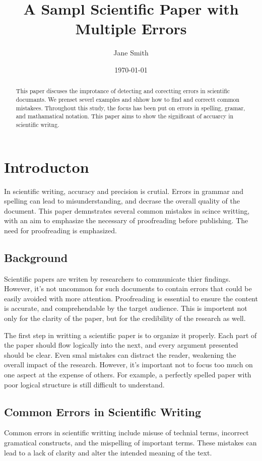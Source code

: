 \documentclass{article}
\title{A Sampl Scientific Paper with Multiple Errors}
\author{Jane Smith}
\date{\today}
\begin{document}
\maketitle

\begin{abstract}
This paper discuses the improtance of detecting and corectting errors in scientific documants. We prenset severl examples and shhow how to find and correctt common mistakees. Throughout this study, the focus has been put on errors in spelling, gramar, and mathamatical notation. This paper aims to show the significant of accuarcy in scientific writng.
\end{abstract}

\section{Introducton}
In scientific writing, accuracy and precision is crutial. Errors in grammar and spelling can lead to misunderstanding, and decrase the overall quality of the document. This paper demnstrates several common mistakes in scince writting, with an aim to emphasize the necessary of proofreading before publishing. The need for proofreading is emphasized.

\subsection{Background}
Scientific papers are writen by researchers to communicate thier findings. However, it's not uncommon for such documents to contain errors that could be easily avoided with more attention. Proofreading is essential to ensure the content is accurate, and comprehendable by the target audience. This is importent not only for the clarity of the paper, but for the credibility of the research as well.

The first step in writting a scientific paper is to organize it properly. Each part of the paper should flow logically into the next, and every argument presented should be clear. Even smal mistakes can distract the reader, weakening the overall impact of the research. However, it's important not to focus too much on one aspect at the expense of others. For example, a perfectly spelled paper with poor logical structure is still difficult to understand.

\subsection{Common Errors in Scientific Writing}
Common errors in scientific writting include misuse of technial terms, incorrect gramatical constructs, and the mispelling of important terms. These mistakes can lead to a lack of clarity and alter the intended meaning of the text.
\end{document}
